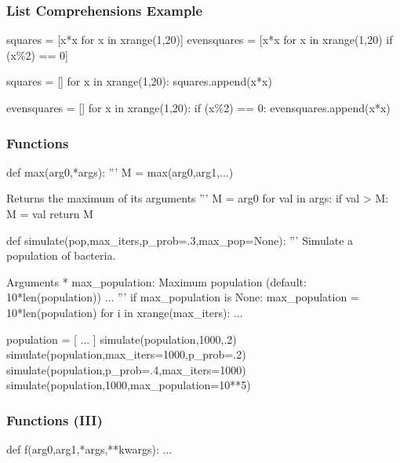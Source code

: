 \begin{frame}[fragile]
\frametitle{List Comprehensions Example}

\begin{python}
squares = [x*x for x in xrange(1,20)]
evensquares = [x*x for x in xrange(1,20) if (x\%2) == 0]
\end{python}

\begin{python}
squares = []
for x in xrange(1,20):
    squares.append(x*x)

evensquares = []
for x in xrange(1,20):
    if (x\%2) == 0:
        evensquares.append(x*x)
\end{python}

\end{frame}

\begin{frame}[fragile]
\frametitle{Functions}

\begin{python}
def max(arg0,*args):
    '''
    M = max(arg0,arg1,...)

    Returns the maximum of its arguments
    '''
    M = arg0
    for val in args:
        if val > M:
            M = val
    return M
\end{python}

\end{frame}

\begin{frame}[fragile]
\begin{python}
def simulate(pop,max_iters,p_prob=.3,max_pop=None):
    '''
    Simulate a population of bacteria.

    Arguments
        * max_population: Maximum population
                        (default: 10*len(population))
        ...
    '''
    if max_population is None:
        max_population = 10*len(population)
    for i in xrange(max_iters):
        ...

population = [ ... ]
simulate(population,1000,.2)
simulate(population,max_iters=1000,p_prob=.2)
simulate(population,p_prob=.4,max_iters=1000)
simulate(population,1000,max_population=10**5)
\end{python}
\end{frame}

\begin{frame}[fragile]
\frametitle{Functions (III)}

\begin{python}
def f(arg0,arg1,*args,**kwargs):
    ...
\end{python}
\end{frame}

